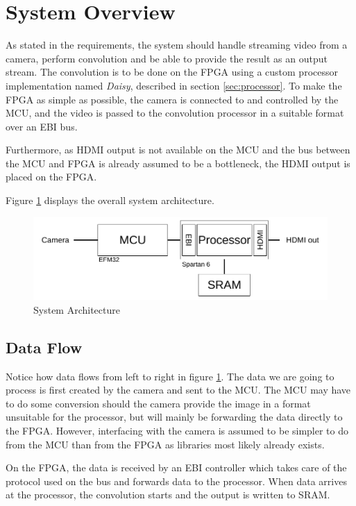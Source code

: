 \section{System Overview}
As stated in the requirements, the system should handle streaming video from a camera, perform convolution and be able to provide the result as an output stream.
The convolution is to be done on the FPGA using a custom processor implementation named \textit{Daisy}, described in section \ref{sec:processor}.
To make the FPGA as simple as possible, the camera is connected to and controlled by the MCU, and the video is passed to the convolution processor in a suitable format over an EBI bus.

Furthermore, as HDMI output is not available on the MCU and the bus between the MCU and FPGA is already assumed to be a bottleneck, the HDMI output is placed on the FPGA.

Figure \ref{fig:systemArchitecture} displays the overall system architecture.

\begin{figure}
    \includegraphics{img/SystemArchitecture.pdf}
    \caption{System Architecture}
    \label{fig:systemArchitecture}
\end{figure}



\subsection{Data Flow}
Notice how data flows from left to right in figure \ref{fig:systemArchitecture}.
The data we are going to process is first created by the camera and sent to the MCU.
The MCU may have to do some conversion should the camera provide the image in a format unsuitable for the processor, but will mainly be forwarding the data directly to the FPGA.
However, interfacing with the camera is assumed to be simpler to do from the MCU than from the FPGA as libraries most likely already exists.

On the FPGA, the data is received by an EBI controller which takes care of the protocol used on the bus and forwards data to the processor.
When data arrives at the processor, the convolution starts and the output is written to SRAM.

